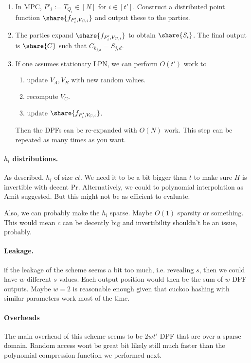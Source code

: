 \begin{enumerate}
    \item In MPC, $P'_i:=T_{Q_i}\in [N]$ for $i\in [t']$. Construct a distributed point function $\share{f_{P'_i, V_{C,i}}}$ and output these to the parties.

    \item The parties expand $\share{f_{P'_i, V_{C,i}}}$ to obtain $\share{S_i}$. The final output is $\share{C}$ such that $C_{k_{j,d}} = S_{j,d}$.


    \item If one assumes stationary LPN, we can perform $O(t')$ work to
    \begin{enumerate}
        \item update $V_A,V_B$ with new random values.
        \item recompute $V_C$.
        \item update $\share{f_{P'_i, V_{C,i}}}$.
    \end{enumerate}
    Then the DPFs can be re-expanded with $O(N)$ work. This step can be repeated as many times as you want.
    
\end{enumerate}



\paragraph{$h_i$ distributions.} As described, $h_i$ of size $ct$. We need it to be a bit bigger than $t$ to make sure $H$ is invertible with decent Pr. Alternatively, we could to polynomial interpolation as Amit suggested. But this might not be as efficient to evaluate. 

Also, we can probably make the $h_i$ sparse. Maybe $O(1)$ sparsity or something. This would mean $c$ can be decently big and invertibility shouldn't be an issue, probably.


\paragraph{Leakage.} if the leakage of the scheme seems a bit too much, i.e. revealing $s$, then we could have $w$ different $s$ values. Each output position would then be the sum of $w$ DPF outputs. Maybe $w=2$ is reasonable enough given that cuckoo hashing with similar parameters work most of the time.

\paragraph{Overheads} The main overhead of this scheme seems to be $2wt'$ DPF that are over a sparse domain. Random access wont be great bit likely still much faster than the polynomial compression function we performed next.


